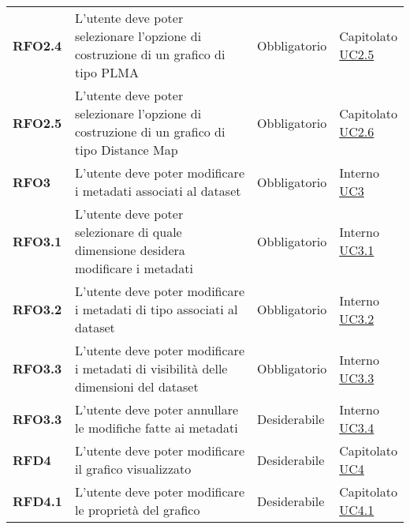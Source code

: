 \begin{longtable}[H]{>{\raggedright\bfseries}m{20mm} >{\raggedright}m{90mm} >{\raggedright}m{28mm} >{\raggedright\arraybackslash}m{30mm}}
    RFO2.4
    & L'utente deve poter selezionare l'opzione di costruzione di un grafico di tipo PLMA
    & Obbligatorio
    & \makecell{Capitolato \\ \hyperref[ssub:uc2.5]{UC2.5}}\\

    RFO2.5
    & L'utente deve poter selezionare l'opzione di costruzione di un grafico di tipo Distance Map
    & Obbligatorio
    & \makecell{Capitolato \\ \hyperref[ssub:uc2.6]{UC2.6}}\\

    RFO3
    & L'utente deve poter modificare i metadati associati al dataset
    & Obbligatorio
    & \makecell{ Interno \\  \hyperref[sub:uc3]{UC3} }\\

    RFO3.1
    & L'utente deve poter selezionare di quale dimensione desidera modificare i metadati
    & Obbligatorio
    & \makecell{ Interno \\\hyperref[ssub:uc3.1]{UC3.1} }\\

    RFO3.2
    & L'utente deve poter modificare i metadati di tipo associati al dataset
    & Obbligatorio
    & \makecell{ Interno \\\hyperref[ssub:uc3.2]{UC3.2} }\\

    RFO3.3
    & L'utente deve poter modificare i metadati di visibilità delle dimensioni del dataset
    & Obbligatorio
    & \makecell{ Interno \\  \hyperref[ssub:uc3.3]{UC3.3} }\\

    RFO3.3
    & L'utente deve poter annullare le modifiche fatte ai metadati
    & Desiderabile
    & \makecell{ Interno \\  \hyperref[ssub:uc3.4]{UC3.4} }\\

    RFD4
    & L'utente deve poter modificare il grafico visualizzato
    & Desiderabile
    & \makecell{ Capitolato \\ \hyperref[sub:uc4]{UC4} }\\

    RFD4.1
    & L'utente deve poter modificare le proprietà del grafico
    & Desiderabile
    & \makecell{ Capitolato \\ \hyperref[ssub:uc4.1]{UC4.1} }\\


\end{longtable}
